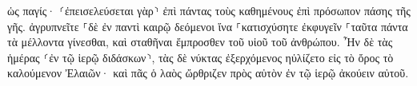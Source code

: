 \documentclass{openreader}
\begin{document}
ὡς παγίς· ⸂ἐπεισελεύσεται γὰρ⸃ ἐπὶ πάντας τοὺς καθημένους ἐπὶ πρόσωπον πάσης τῆς γῆς. 
ἀγρυπνεῖτε ⸀δὲ ἐν παντὶ καιρῷ δεόμενοι ἵνα ⸀κατισχύσητε ἐκφυγεῖν ⸀ταῦτα πάντα τὰ μέλλοντα γίνεσθαι, καὶ σταθῆναι ἔμπροσθεν τοῦ υἱοῦ τοῦ ἀνθρώπου. 
Ἦν δὲ τὰς ἡμέρας ⸂ἐν τῷ ἱερῷ διδάσκων⸃, τὰς δὲ νύκτας ἐξερχόμενος ηὐλίζετο εἰς τὸ ὄρος τὸ καλούμενον Ἐλαιῶν· 
καὶ πᾶς ὁ λαὸς ὤρθριζεν πρὸς αὐτὸν ἐν τῷ ἱερῷ ἀκούειν αὐτοῦ. 
\end{document}

